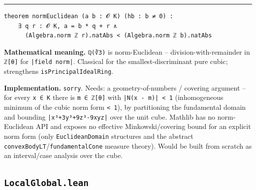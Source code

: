 \documentclass[UTF8,a4paper,11pt,fontset=fandol]{ctexart}
\theoremstyle{definition}
\newcommand{\statementsep}{\par\medskip\hrule\medskip}
\begin{document}
\statementsep
\begin{verbatim}
theorem normEuclidean (a b : 𝓞 K) (hb : b ≠ 0) :
    ∃ q r : 𝓞 K, a = b * q + r ∧
      (Algebra.norm ℤ r).natAbs < (Algebra.norm ℤ b).natAbs
\end{verbatim}
\noindent\textbf{Mathematical meaning.} \texttt{ℚ(∛3)} is norm-Euclidean -- division-with-remainder in \texttt{ℤ[θ]} for \texttt{|field norm|}. Classical for the smallest-discriminant pure cubic; strengthens \texttt{isPrincipalIdealRing}.\par
\noindent\textbf{Implementation.} \texttt{sorry}. Needs: a geometry-of-numbers / covering argument -- for every \texttt{x ∈ K} there is \texttt{m ∈ ℤ[θ]} with \texttt{|N(x - m)| < 1} (inhomogeneous minimum of the cubic norm form \texttt{< 1}), by partitioning the fundamental domain and bounding \texttt{|x³+3y³+9z³-9xyz|} over the unit cube. Mathlib has no norm-Euclidean API and exposes no effective Minkowski/covering bound for an explicit norm form (only \texttt{EuclideanDomain} structures and the abstract \texttt{convexBodyLT}/\texttt{fundamentalCone} measure theory). Would be built from scratch as an interval/case analysis over the cube.\par

\subsection{\texttt{LocalGlobal.lean}}
\end{document}
